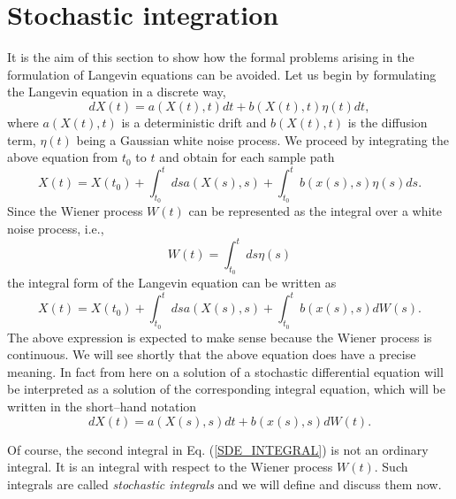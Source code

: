 \section{Stochastic integration}
It is the aim of this section to show how the formal problems
arising in the formulation of Langevin equations can be avoided.
Let us begin by formulating the Langevin equation in a discrete 
way,
\begin{equation*}
dX(t) = a(X(t),t) dt + b(X(t),t) \eta(t) dt,
\end{equation*}
where $a(X(t),t)$ is a deterministic drift and $b(X(t),t)$ is the 
diffusion term, $\eta(t)$ being a Gaussian white noise process.
We proceed by integrating the above equation from $t_0$ to $t$
and obtain for each sample path
\begin{equation*}
X(t) = X(t_0) + \int_{t_0}^t ds a(X(s),s) 
+ \int_{t_0}^t b(x(s),s) \eta(s) ds.
\end{equation*}
Since the Wiener process $W(t)$ can be represented as the integral
over a white noise process, i.e.,
\begin{equation}
W(t) = \int_{t_0}^t ds \eta(s)
\end{equation}
the integral form of the Langevin equation can be written as
\begin{equation}
\label{SDE_INTEGRAL}
X(t) = X(t_0) + \int_{t_0}^t ds a(X(s),s) 
+ \int_{t_0}^t b(x(s),s) dW(s).
\end{equation}
The above expression is 
expected to make sense because the Wiener process is continuous. 
We will see shortly that the above 
equation does have a precise meaning. In fact
from here on a solution of a stochastic differential equation will be 
interpreted as a solution 
of the corresponding integral equation, which will be written
in the short--hand notation
\begin{equation*}
dX(t) =   a(X(s),s) dt + b(x(s),s) dW(t).
\end{equation*}

Of course, the second integral in Eq. (\ref{SDE_INTEGRAL}) is not 
an ordinary integral.  It is an integral with respect to the 
Wiener process $W(t)$. Such integrals are called {\em stochastic 
integrals} and we will define and discuss them now.

